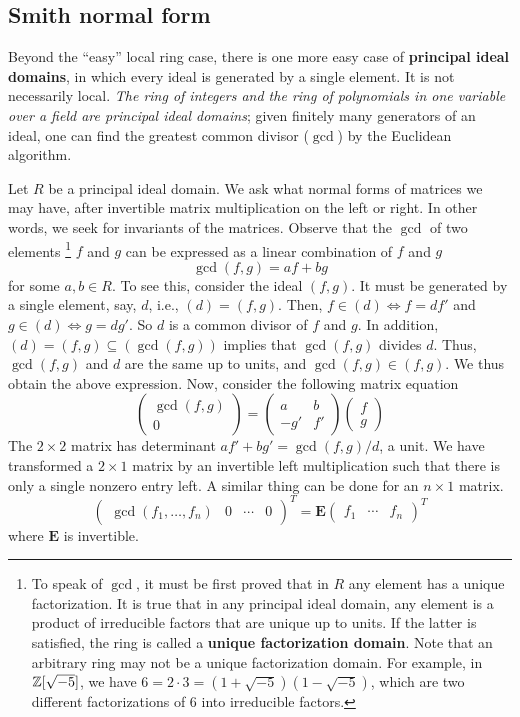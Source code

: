\subsection*{Smith normal form}

Beyond the ``easy'' local ring case,
there is one more easy case of {\bf principal ideal domains},
in which every ideal is generated by a single element.
It is not necessarily local.
{\em The ring of integers and the ring of polynomials in one variable over a field
are principal ideal domains};
given finitely many generators of an ideal,
one can find the greatest common divisor ($\gcd$) by the Euclidean algorithm.

Let $R$ be a principal ideal domain.
We ask what normal forms of matrices we may have, after
invertible matrix multiplication on the left or right.
In other words, we seek for invariants of the matrices.
Observe that the $\gcd$ of two elements%
\footnote{To speak of $\gcd$, it must be first proved that in $R$ any element has a unique factorization.
It is true that in any principal ideal domain, any element is a product of irreducible factors
that are unique up to units. If the latter is satisfied, the ring is called a {\bf unique factorization domain}.
Note that an arbitrary ring may not be a unique factorization domain.
For example, in $\mathbb{Z}[\sqrt{-5}]$, we have $6 = 2 \cdot 3 = (1+\sqrt{-5})(1-\sqrt{-5})$,
which are two different factorizations of $6$ into irreducible factors.}
$f$ and $g$ can be expressed as a linear combination of $f$ and $g$
\[
\gcd(f,g) = a f + b g
\]
for some $a,b \in R$. To see this, consider the ideal $(f,g)$.
It must be generated by a single element, say, $d$, i.e., $(d) = (f,g)$.
Then, $f \in (d) \Longleftrightarrow f = d f'$ and $g \in (d) \Longleftrightarrow g = d g'$.
So $d$ is a common divisor of $f$ and $g$. In addition, $(d) = (f,g) \subseteq (\gcd(f,g))$
implies that $\gcd(f,g)$ divides $d$. Thus, $\gcd(f,g)$ and $d$ are the same up to units,
and $\gcd(f,g) \in (f,g)$. We thus obtain the above expression.
Now, consider the following matrix equation
\[
\begin{pmatrix} \gcd(f,g) \\ 0 \end{pmatrix}
= \begin{pmatrix} a & b \\ -g' & f' \end{pmatrix} \begin{pmatrix} f \\ g \end{pmatrix}
\]
The $2 \times 2$ matrix has determinant $af' + bg' = \gcd(f,g)/d$, a unit.
We have transformed a $2 \times 1$ matrix by an invertible left multiplication
such that there is only a single nonzero entry left. 
A similar thing can be done for an $n \times 1$ matrix.
\[
\begin{pmatrix} \gcd(f_1,\ldots,f_n) & 0 & \cdots & 0 \end{pmatrix}^T
= \mathbf E \begin{pmatrix} f_1 & \cdots & f_n \end{pmatrix}^T
\]
where $\mathbf E$ is invertible.

